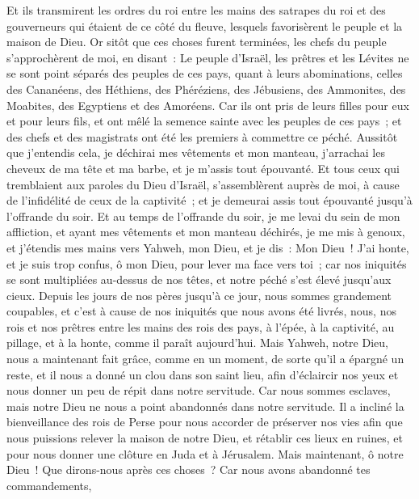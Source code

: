 \begin{multicols}{2}
Et ils transmirent les ordres du roi entre les mains des satrapes du roi et des gouverneurs qui étaient de ce côté du fleuve, lesquels favorisèrent le peuple et la maison de Dieu.
\VerseOne{}Or sitôt que ces choses furent terminées, les chefs du peuple s'approchèrent de moi, en disant~: Le peuple d'Israël, les prêtres et les Lévites ne se sont point séparés des peuples de ces pays, quant à leurs abominations, celles des Cananéens, des Héthiens, des Phéréziens, des Jébusiens, des Ammonites, des Moabites, des Egyptiens et des Amoréens.
Car ils ont pris de leurs filles pour eux et pour leurs fils, et ont mêlé la semence sainte avec les peuples de ces pays~; et des chefs et des magistrats ont été les premiers à commettre ce péché.
Aussitôt que j'entendis cela, je déchirai mes vêtements et mon manteau, j'arrachai les cheveux de ma tête et ma barbe, et je m'assis tout épouvanté.
Et tous ceux qui tremblaient aux paroles du Dieu d'Israël, s'assemblèrent auprès de moi, à cause de l'infidélité de ceux de la captivité~; et je demeurai assis tout épouvanté jusqu'à l'offrande du soir.
Et au temps de l'offrande du soir, je me levai du sein de mon affliction, et ayant mes vêtements et mon manteau déchirés, je me mis à genoux, et j'étendis mes mains vers Yahweh, mon Dieu,
et je dis~: Mon Dieu~! J'ai honte, et je suis trop confus, ô mon Dieu, pour lever ma face vers toi~; car nos iniquités se sont multipliées au-dessus de nos têtes, et notre péché s'est élevé jusqu'aux cieux.
Depuis les jours de nos pères jusqu'à ce jour, nous sommes grandement coupables, et c'est à cause de nos iniquités que nous avons été livrés, nous, nos rois et nos prêtres entre les mains des rois des pays, à l'épée, à la captivité, au pillage, et à la honte, comme il paraît aujourd'hui.
Mais Yahweh, notre Dieu, nous a maintenant fait grâce, comme en un moment, de sorte qu'il a épargné un reste, et il nous a donné un clou dans son saint lieu, afin d'éclaircir nos yeux et nous donner un peu de répit dans notre servitude.
Car nous sommes esclaves, mais notre Dieu ne nous a point abandonnés dans notre servitude. Il a incliné la bienveillance des rois de Perse pour nous accorder de préserver nos vies afin que nous puissions relever la maison de notre Dieu, et rétablir ces lieux en ruines, et pour nous donner une clôture en Juda et à Jérusalem.
Mais maintenant, ô notre Dieu~! Que dirons-nous après ces choses~? Car nous avons abandonné tes commandements,

\end{multicols}
